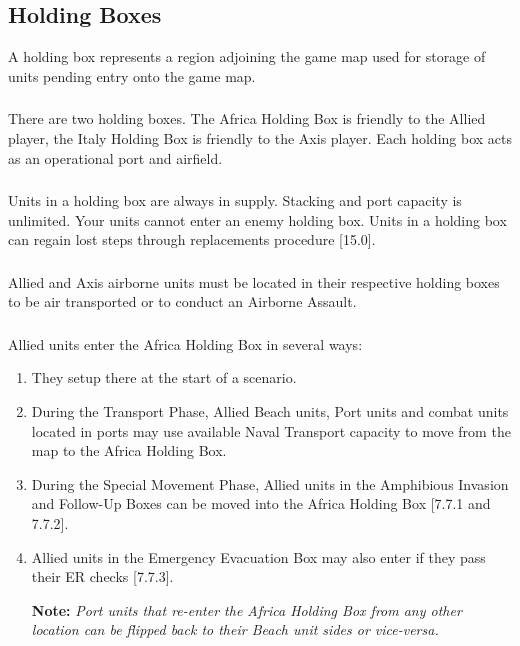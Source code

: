 \subsection{Holding Boxes}
A holding box represents a region adjoining the game map used for storage of units pending entry onto the game map.

\subsubsection{}
There are two holding boxes. The Africa Holding Box is friendly to the Allied player, the Italy Holding Box is friendly to the Axis player. Each holding box acts as an operational port and airfield.

\subsubsection{}
Units in a holding box are always in supply. Stacking and port capacity is unlimited. Your units cannot enter an enemy holding box. Units in a holding box can regain lost steps through replacements procedure [15.0].

\subsubsection{}
Allied and Axis airborne units must be located in their respective holding boxes to be air transported or to conduct an Airborne Assault.

\subsubsection{}
Allied units enter the Africa Holding Box in several ways:

\begin{enumerate}[label=\alph*.]
    \item They setup there at the start of a scenario.
    \item During the Transport Phase, Allied Beach units, Port units and combat units located in ports may use available Naval Transport capacity to move from the map to the Africa Holding Box.
    \item During the Special Movement Phase, Allied units in the Amphibious Invasion and Follow-Up Boxes can be moved into the Africa Holding Box [7.7.1 and 7.7.2].
    \item Allied units in the Emergency Evacuation Box may also enter if they pass their ER checks [7.7.3].
    
    \textbf{Note:} \textit{Port units that re-enter the Africa Holding Box from any other location can be flipped back to their Beach unit sides or vice-versa.}
\end{enumerate}

